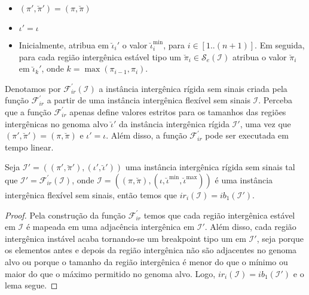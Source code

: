 \begin{itemize}
  \item $(\pi',\breve\pi') = (\pi,\breve\pi)$
  \item $\iota' = \iota$
  \item Inicialmente, atribua em $\breve\iota_{i}'$ o valor $\breve\iota^{\min}_i$, para $i \in [1..({n+1})]$. Em seguida, para cada região intergênica estável tipo um $\breve\pi_i \in \mathcal{S}_{e}(\mathcal{I})$ atribua o valor $\breve\pi_i$ em $\breve\iota_{k}'$, onde $k = \max(\pi_{i-1},\pi_i)$.
\end{itemize}

Denotamos por $\mathcal{F}_{ir}^{'}(\mathcal{I})$ a instância intergênica rígida sem sinais criada pela função $\mathcal{F}_{ir}^{'}$ a partir de uma instância intergênica flexível sem sinais $\mathcal{I}$. Perceba que a função $\mathcal{F}_{ir}^{'}$ apenas define valores estritos para os tamanhos das regiões intergênicas no genoma alvo $\breve\iota'$ da instância intergênica rígida $\mathcal{I'}$, uma vez que $(\pi',\breve\pi') = (\pi,\breve\pi)$ e $\iota' = \iota$. Além disso, a função $\mathcal{F}_{ir}^{'}$ pode ser executada em tempo linear.

\begin{lemma}\label{lemma:UFTVNRSX}
Seja $\mathcal{I'} = ((\pi',\breve\pi'),(\iota',\breve\iota'))$ uma instância intergênica rígida sem sinais tal que $\mathcal{I'} = \mathcal{F}_{ir}^{'}(\mathcal{I})$, onde $\mathcal{I} = ((\pi,\breve\pi),(\iota,\breve\iota^{\min},\breve\iota^{\max}))$ é uma instância intergênica flexível sem sinais, então temos que $ir_i(\mathcal{I}) = ib_1(\mathcal{I'})$.
\end{lemma}
\begin{proof}
Pela construção da função $\mathcal{F}_{ir}^{'}$ temos que cada região intergênica estável em $\mathcal{I}$ é mapeada em uma adjacência intergênica em $\mathcal{I'}$. Além disso, cada região intergênica instável acaba tornando-se um breakpoint tipo um em $\mathcal{I'}$, seja porque os elementos antes e depois da região intergênica não são adjacentes no genoma alvo ou porque o tamanho da região intergênica é menor do que o mínimo ou maior do que o máximo permitido no genoma alvo. Logo, $ir_i(\mathcal{I}) = ib_1(\mathcal{I'})$ e o lema segue.
\end{proof}

